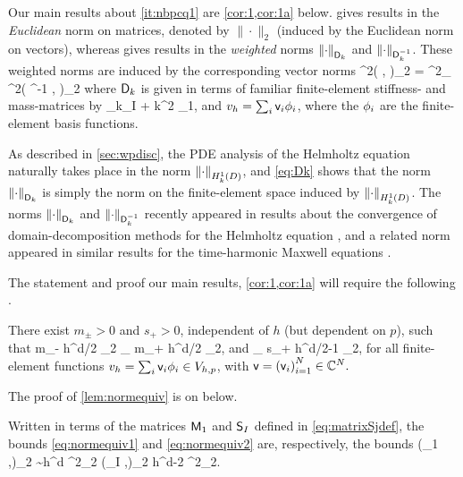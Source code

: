 Our main results about \cref{it:nbpcq1} are \cref{cor:1,cor:1a} below.  gives results in the \emph{Euclidean} norm on matrices, denoted by $\|\cdot\|_2$ (induced by the Euclidean norm on vectors), whereas  gives results in the \emph{weighted} norms $\NDmatk{\cdot}$ and $\NDmatkI{\cdot}$. These weighted norms are induced by the corresponding vector norms
\beq\label{eq:Dk}
\NDmatk{\vvec}^2\de \big( \Dmatk \vvec, \vvec\big)_2 = %
^2_{\HokD}
\quad \tand
\quad \NDmatkI{\vvec}^2\de \big( \Dmatk^{-1} \vvec, \vvec\big)_2 %
\eeq
where $\mathsf{D}_{k}$ is given in terms of familiar finite-element stiffness- and mass-matrices by
\beqs
\Dmat_k\de \Smat_I + k^2 \Mmat_1,
\eeqs
and $v_{h} =\sum_i \mathsf{v}_{i} \phi_{i}$, where the $\phi_{i}$ are the finite-element basis functions.


As described in \cref{sec:wpdisc}, the PDE analysis of the Helmholtz equation naturally takes place in the norm $\NHokD{\cdot}$, and \cref{eq:Dk} shows that the norm $\NDmatk{\cdot}$ is simply the norm on the finite-element space induced by  $\NHokD{\cdot}$. %
The norms $\NDmatk{\cdot}$ and $\NDmatkI{\cdot}$ recently appeared in results about the convergence of domain-decomposition methods %
for the Helmholtz equation \cite{GrSpVa:17,GrSpZo:18}, and a related norm appeared in similar results for the time-harmonic Maxwell equations \cite{BoDoGrSpTo:19}. 

The statement and proof our main results, \cref{cor:1,cor:1a} will require the following .

\label{lem:normequiv}
There exist $m_\pm >0$ and $s_+>0$, independent of $h$ (but dependent on $p$), such that
\beq\label{eq:normequiv1}
m_- h^{d/2} \N{\vvec}_2 \leq {}_{\LtD} \leq m_+ h^{d/2} \N{\vvec}_2,
\eeq
and
\beq\label{eq:normequiv2}
_{\LtD} \leq s_+ h^{d/2-1} \N{\vvec}_2,
\eeq
for all finite-element functions $v_h =\sum_i \mathsf{v}_i \phi_i \in V_{h,p}$, with $\vvec = \mleft(\vveci\mright)_{i=1}^N \in \CCN.$
\ele

The proof of \cref{lem:normequiv} is on  below.

Written in terms of the matrices $\mathsf{M}_1$ and $\mathsf{S}_I$ defined in \cref{eq:matrixSjdef}, the bounds \cref{eq:normequiv1} and \cref{eq:normequiv2} are, respectively, the bounds
\beqs
(\Mmat_1 \vvec,\vvec)_2 \sim h^d \N{\vvec}^2_2 \quad\tand\quad (\Smat_I \vvec,\vvec)_2 \lesssim h^{d-2} \N{\vvec}^2_2.
\eeqs


